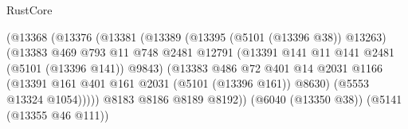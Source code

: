 \begin{lexlean}{RustCore}
\begin{coremodule}
                                                (@13368
                                                  (@13376
                                                    (@13381
                                                      (@13389
                                                        (@13395 (@5101 (@13396 @38)) @13263)
                                                        (@13383
                                                          @469
                                                          @793
                                                          @11
                                                          @748
                                                          @2481
                                                          @12791
                                                          (@13391
                                                            @141
                                                            @11
                                                            @141
                                                            @2481
                                                            (@5101 (@13396 @141))
                                                            @9843)
                                                          (@13383
                                                            @486
                                                            @72
                                                            @401
                                                            @14
                                                            @2031
                                                            @1166
                                                            (@13391
                                                              @161
                                                              @401
                                                              @161
                                                              @2031
                                                              (@5101 (@13396 @161))
                                                              @8630)
                                                            (@5553 @13324 @1054)))))
                                                    @8183
                                                    @8186
                                                    @8189
                                                    @8192))
                                                (@6040 (@13350 @38))
                                                (@5141 (@13355 @46 @111))

\end{coremodule}
\end{lexlean}

